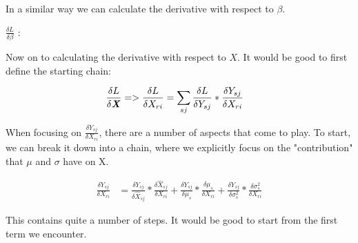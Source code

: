 \vspace{1cm}
In a similar way we can calculate the derivative with respect to $\beta$.

{\Large $\frac{\delta L}{\delta \beta}$ }:

\vspace{1cm}
Now on to calculating the derivative with respect to $X$. It would be good to first define the starting chain:

\begin{align}
    \frac{\delta L}{\delta \textbf{\emph{X}}}
    &=> \frac{\delta L}{\delta X_{ri}}
    = \sum_{sj} \frac{\delta L}{\delta Y_{sj}} * \frac{\delta Y_{sj}}{\delta X_{ri}}
\end{align}

When focusing on $\frac{\delta Y_{sj}}{\delta X_{ri}}$, there are a number of aspects that come to play. 
To start, we can break it down into a chain, where we explicitly focus on the "contribution"
that $\mu$ and $\sigma$ have on X.

\begin{align}
    \frac{\delta Y_{sj}}{\delta X_{ri}} &= 
        \frac{\delta Y_{sj}}{\delta \hat{X}_{sj}} * \frac{\delta \hat{X}_{sj}}{\delta X_{ri}}
            + \frac{\delta Y_{sj}}{\delta \mu_s} * \frac{\delta \mu_s}{\delta X_{ri}}
            + \frac{\delta Y_{sj}}{\delta \sigma^2_s} * \frac{\delta \sigma^2_s}{\delta X_{ri}}
\end{align}

This contains quite a number of steps. It would be good to start from the first term we encounter.

